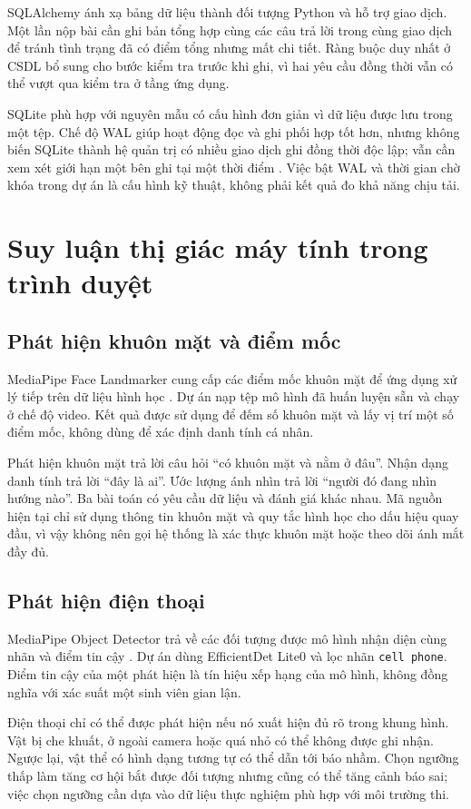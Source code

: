 SQLAlchemy ánh xạ bảng dữ liệu thành đối tượng Python và hỗ trợ giao dịch. Một lần nộp bài cần ghi bản tổng hợp cùng các câu trả lời trong cùng giao dịch để tránh tình trạng đã có điểm tổng nhưng mất chi tiết. Ràng buộc duy nhất ở CSDL bổ sung cho bước kiểm tra trước khi ghi, vì hai yêu cầu đồng thời vẫn có thể vượt qua kiểm tra ở tầng ứng dụng.

SQLite phù hợp với nguyên mẫu có cấu hình đơn giản vì dữ liệu được lưu trong một tệp. Chế độ WAL giúp hoạt động đọc và ghi phối hợp tốt hơn, nhưng không biến SQLite thành hệ quản trị có nhiều giao dịch ghi đồng thời độc lập; vẫn cần xem xét giới hạn một bên ghi tại một thời điểm \cite{sqlitewal}. Việc bật WAL và thời gian chờ khóa trong dự án là cấu hình kỹ thuật, không phải kết quả đo khả năng chịu tải.

\section{Suy luận thị giác máy tính trong trình duyệt}
\subsection{Phát hiện khuôn mặt và điểm mốc}
MediaPipe Face Landmarker cung cấp các điểm mốc khuôn mặt để ứng dụng xử lý tiếp trên dữ liệu hình học \cite{mpface}. Dự án nạp tệp mô hình đã huấn luyện sẵn và chạy ở chế độ video. Kết quả được sử dụng để đếm số khuôn mặt và lấy vị trí một số điểm mốc, không dùng để xác định danh tính cá nhân.

Phát hiện khuôn mặt trả lời câu hỏi ``có khuôn mặt và nằm ở đâu''. Nhận dạng danh tính trả lời ``đây là ai''. Ước lượng ánh nhìn trả lời ``người đó đang nhìn hướng nào''. Ba bài toán có yêu cầu dữ liệu và đánh giá khác nhau. Mã nguồn hiện tại chỉ sử dụng thông tin khuôn mặt và quy tắc hình học cho dấu hiệu quay đầu, vì vậy không nên gọi hệ thống là xác thực khuôn mặt hoặc theo dõi ánh mắt đầy đủ.

\subsection{Phát hiện điện thoại}
MediaPipe Object Detector trả về các đối tượng được mô hình nhận diện cùng nhãn và điểm tin cậy \cite{mpobject}. Dự án dùng EfficientDet Lite0 và lọc nhãn \texttt{cell phone}. Điểm tin cậy của một phát hiện là tín hiệu xếp hạng của mô hình, không đồng nghĩa với xác suất một sinh viên gian lận.

Điện thoại chỉ có thể được phát hiện nếu nó xuất hiện đủ rõ trong khung hình. Vật bị che khuất, ở ngoài camera hoặc quá nhỏ có thể không được ghi nhận. Ngược lại, vật thể có hình dạng tương tự có thể dẫn tới báo nhầm. Chọn ngưỡng thấp làm tăng cơ hội bắt được đối tượng nhưng cũng có thể tăng cảnh báo sai; việc chọn ngưỡng cần dựa vào dữ liệu thực nghiệm phù hợp với môi trường thi.

